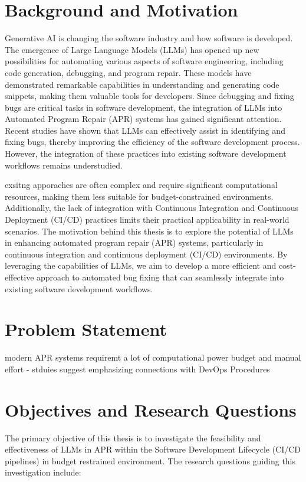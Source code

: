 \section{Background and Motivation}
Generative AI is changing the software industry and how software is developed. The emergence of Large Language Models (LLMs) has opened up new possibilities for automating various aspects of software engineering, including code generation, debugging, and program repair. These models have demonstrated remarkable capabilities in understanding and generating code snippets, making them valuable tools for developers.
Since debugging and fixing bugs are critical tasks in software development, the integration of LLMs into Automated Program Repair (APR) systems has gained significant attention. Recent studies have shown that LLMs can effectively assist in identifying and fixing bugs, thereby improving the efficiency of the software development process.
However, the integration of these practices into existing software development workflows remains understudied. 

exsitng apporaches are often complex and require significant computational resources, making them less suitable for budget-constrained environments. Additionally, the lack of integration with Continuous Integration and Continuous Deployment (CI/CD) practices limits their practical applicability in real-world scenarios.
The motivation behind this thesis is to explore the potential of LLMs in enhancing automated program repair (APR) systems, particularly in continuous integration and continuous deployment (CI/CD) environments. By leveraging the capabilities of LLMs, we aim to develop a more efficient and cost-effective approach to automated bug fixing that can seamlessly integrate into existing software development workflows.



\section{Problem Statement}
modern APR systems requiremt a lot of computational power budget and manual effort - stduies suggest emphasizing connections with DevOps Procedures \cite{puvvadiCodingAgentsComprehensive2025}

\section{Objectives and Research Questions}
The primary objective of this thesis is to investigate the feasibility and effectiveness of LLMs in APR within the Software Development Lifecycle (CI/CD pipelines) in budget restrained environment. The research questions guiding this investigation include: